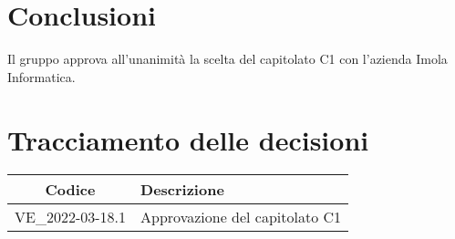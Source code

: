 \section{Conclusioni}
Il gruppo approva all'unanimità la scelta del capitolato C1 con l'azienda Imola Informatica.
\newpage
	
\section*{Tracciamento delle decisioni}
\renewcommand{\arraystretch}{1.8} %
	\begin{tabular}{ |c|l| }
		\hline
		\textbf{Codice} & \textbf{Descrizione} \\
		\hline
		VE\_2022-03-18.1 & Approvazione del capitolato C1 \\
		\hline
	\end{tabular}
